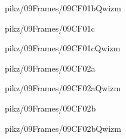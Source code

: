 \documentclass[9pt,xcolor={svgnames, x11names}]{beamer}
\begin{document}

\begin{frame}{pikz/09Frames/09CF01bQwizm}
  
\end{frame}


\begin{frame}{pikz/09Frames/09CF01c}
  
\end{frame}


\begin{frame}{pikz/09Frames/09CF01cQwizm}
  
\end{frame}


\begin{frame}{pikz/09Frames/09CF02a}
  
\end{frame}


\begin{frame}{pikz/09Frames/09CF02aQwizm}
  
\end{frame}


\begin{frame}{pikz/09Frames/09CF02b}
  
\end{frame}


\begin{frame}{pikz/09Frames/09CF02bQwizm}
  
\end{frame}

\end{document}
